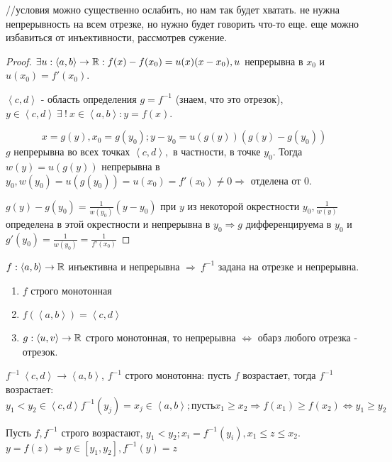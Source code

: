 \documentclass[12pt]{report}
\begin{document}
\begin{enumerate}
//условия можно существенно ослабить, но нам так будет хватать. не нужна непрерывность на всем отрезке, но нужно будет говорить что-то еще. еще можно избавиться от инъективности, рассмотрев сужение.

\begin{proof}
$\exists u: \left<a, b\right> \to \mathbb{R}: f(x) - f(x_0) = u(x)(x - x_0), u$ непрерывна в $x_0$ и $u(x_0) = f'(x_0)$.

$\left<c, d\right>$ - область определения $g = f^{-1}$ (знаем, что это отрезок), $y \in \left<c, d\right> ~\exists ~! ~x \in \left<a, b\right>: y = f(x)$.

$$x = g(y), x_0 = g(y_0); y - y_0 = u(g(y))(g(y) - g(y_0))$$
$g$ непрерывна во всех точках $\left<c, d\right>,$ в частности, в точке $y_0$. Тогда $w(y) = u(g(y))$ непрерывна в $y_0, w(y_0) = u(g(y_0)) = u(x_0) = f'(x_0) \neq 0 \Rightarrow$ отделена от $0$.

$g(y) - g(y_0) = \frac{1}{w(y_0)}(y - y_0)$ при $y$ из некоторой окрестности $y_0, \frac{1}{w(y)}$ определена в этой окрестности и непрерывна в $y_0 \Rightarrow g$ дифференцируема в $y_0$ и $g'(y_0) = \frac{1}{w(y_0)} = \frac{1}{f'(x_0)}$
\end{proof}

\begin{rem}
$f: \left<a, b\right> \to \mathbb{R}$ инъективна и непрерывна $\Rightarrow ~f^{-1}$ задана на отрезке и непрерывна.

\begin{enumerate}
\item $f$ строго монотонная
\item $f(\left<a, b\right>) = \left<c, d\right>$
\item $g: \left<u, v\right> \to \mathbb{R}$ строго монотонная, то непрерывна $\Leftrightarrow$ обарз любого отрезка - отрезок.
\end{enumerate}

$f^{-1}~\left<c, d\right> \to \left<a, b\right>$, $f^{-1}$ строго монотонна: пусть $f$ возрастает, тогда $f^{-1}$ возрастает:
$$y_1 < y_2 \in \left<c, d\right> f^{-1}(y_j) = x_j \in \left<a, b\right>; \mbox{пусть} x_1 \ge x_2 \Rightarrow f(x_1) \ge f(x_2) \Leftrightarrow y_1 \ge y_2$$

Пусть $f, f^{-1}$ строго возрастают, $y_1 < y_2; x_i = f^{-1}(y_i), x_1 \le z \le x_2$. $y = f(z) \Rightarrow y \in [y_1, y_2], f^{-1}(y) = z$
\end{rem}
\end{enumerate}
\end{document}
